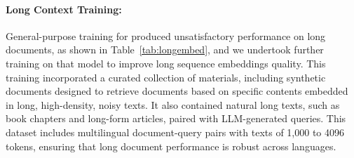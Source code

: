 \documentclass[11pt]{article}
\begin{document}

\paragraph{Long Context Training:}
\label{sec:long-context}
General-purpose training for \JEmbeddingVFiveTextSmall{} produced unsatisfactory performance on long documents, as shown in Table~\ref{tab:longembed}, and we undertook further training on that model to improve long sequence embeddings quality.
This training incorporated a curated collection of materials, including synthetic documents designed to retrieve documents based on specific contents embedded in long, high-density, noisy texts.
It also contained natural long texts, such as book chapters and long-form articles, paired with LLM-generated queries.
This dataset includes multilingual document-query pairs with texts of 1,000 to 4096 tokens, ensuring that long document performance is robust across languages.


\end{document}
